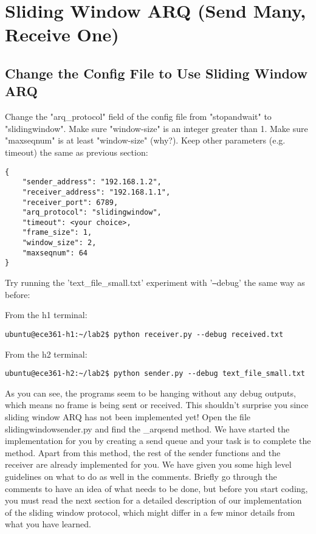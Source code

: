 \documentclass[11pt]{article}
\begin{document}
\section{Sliding Window ARQ (Send Many, Receive One)}
\label{sec:sliding}

\subsection{Change the Config File to Use Sliding Window ARQ}
Change the "arq\_protocol" field of the config file from "stopandwait" to "slidingwindow". Make sure "window-size" is an integer greater than 1. Make sure "maxseqnum" is at least "window-size" (why?). Keep other parameters (e.g. timeout) the same as previous section:

\begin{lstlisting}[caption={Sliding Window Configuration}]
{
    "sender_address": "192.168.1.2",
    "receiver_address": "192.168.1.1",
    "receiver_port": 6789,
    "arq_protocol": "slidingwindow",
    "timeout": <your choice>,
    "frame_size": 1,
    "window_size": 2,
    "maxseqnum": 64
}
\end{lstlisting}


Try running the 'text\_file\_small.txt' experiment with '\texttt{--}debug' the same way as before:

\noindent From the h1 terminal:
\begin{lstlisting}[style=ece361shell, caption={}]
ubuntu@ece361-h1:~/lab2$ python receiver.py --debug received.txt
\end{lstlisting}
From the h2 terminal:
\begin{lstlisting}[style=ece361shell, caption={}]
ubuntu@ece361-h2:~/lab2$ python sender.py --debug text_file_small.txt
\end{lstlisting}

As you can see, the programs seem to be hanging without any debug outputs, which means no frame is being sent or received. This shouldn't surprise you since sliding window ARQ has not been implemented yet! Open the file slidingwindowsender.py and find the \_arqsend method. We have started the implementation for you by creating a send queue and your task is to complete the method. Apart from this method, the rest of the sender functions and the receiver are already implemented for you. We have given you some high level guidelines on what to do as well in the comments. Briefly go through the comments to have an idea of what needs to be done, but before you start coding, you must read the next section for a detailed description of our implementation of the sliding window protocol, which might differ in a few minor details from what you have learned.
\end{document}

